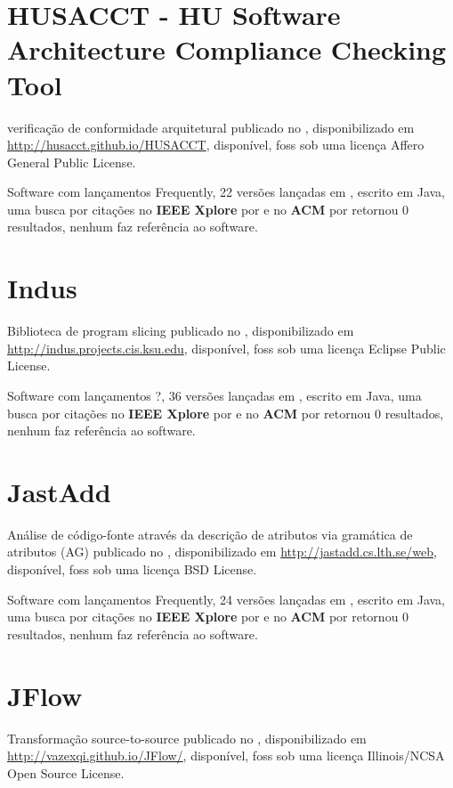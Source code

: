 \section{HUSACCT - HU Software Architecture Compliance Checking Tool}

verificação de conformidade arquitetural
publicado no  ,
disponibilizado em \url{http://husacct.github.io/HUSACCT},
disponível,
foss
sob uma licença Affero General Public License.

Software com lançamentos Frequently,
22 versões lançadas
em ,
escrito em Java,
uma busca por citações no {\bf IEEE Xplore} por
\texttt{}
e no {\bf ACM} por
\texttt{}
retornou
0 resultados,
nenhum faz referência ao software.



\section{Indus}

Biblioteca de program slicing
publicado no  ,
disponibilizado em \url{http://indus.projects.cis.ksu.edu},
disponível,
foss
sob uma licença Eclipse Public License.

Software com lançamentos ?,
36 versões lançadas
em ,
escrito em Java,
uma busca por citações no {\bf IEEE Xplore} por
\texttt{}
e no {\bf ACM} por
\texttt{}
retornou
0 resultados,
nenhum faz referência ao software.



\section{JastAdd}

Análise de código-fonte através da descrição de atributos via gramática de atributos (AG)
publicado no  ,
disponibilizado em \url{http://jastadd.cs.lth.se/web},
disponível,
foss
sob uma licença BSD License.

Software com lançamentos Frequently,
24 versões lançadas
em ,
escrito em Java,
uma busca por citações no {\bf IEEE Xplore} por
\texttt{}
e no {\bf ACM} por
\texttt{}
retornou
0 resultados,
nenhum faz referência ao software.



\section{JFlow}

Transformação source-to-source
publicado no  ,
disponibilizado em \url{http://vazexqi.github.io/JFlow/},
disponível,
foss
sob uma licença Illinois/NCSA Open Source License.

